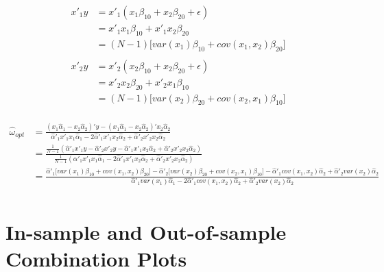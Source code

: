 \documentclass{monashthesis}
\begin{document}
\begin{align*}
    x'_1y &= x'_1(x_1 \beta_{10} + x_2 \beta_{20} + \epsilon) \\
    &= x'_1x_1 \beta_{10} + x'_1x_2 \beta_{20} \\
    &= (N-1) \big[var(x_1)\beta_{10} + cov(x_1,x_2) \beta_{20}\big] \\
\end{align*}
\begin{align*}
    x'_2y &= x'_2(x_2 \beta_{10} + x_2 \beta_{20} + \epsilon) \\
    &= x'_2x_2 \beta_{20} + x'_2x_1 \beta_{10} \\
    &= (N-1) \big[var(x_2)\beta_{20} + cov(x_2,x_1) \beta_{10}\big] \\
\end{align*}

\begin{align*}
    \hat\omega_{opt} &= \frac{(x_1 \hat\alpha_1 - x_2 \hat\alpha_2)' y - (x_1 \hat\alpha_1 - x_2 \hat\alpha_2)' x_2 \hat\alpha_2}{\hat\alpha'_1 x'_1 x_1 \hat\alpha_1 - 2\hat\alpha'_1 x'_1 x_2 \hat\alpha_2 + \hat\alpha'_2 x'_2 x_2 \hat\alpha_2} \\
    &= \frac{\frac{1}{N-1} (\hat\alpha'_1 x'_1y - \hat\alpha'_2 x'_2y - \hat\alpha'_1 x'_1 x_2 \hat\alpha_2 + \hat\alpha'_2 x'_2 x_2 \hat\alpha_2)}{\frac{1}{N-1} (\hat\alpha'_1 x'_1 x_1 \hat\alpha_1 - 2\hat\alpha'_1 x'_1 x_2 \hat\alpha_2 + \hat\alpha'_2 x'_2 x_2 \hat\alpha_2)} \\
    &= \frac{\hat\alpha'_1 \big[var(x_1)\beta_{10} + cov(x_1,x_2) \beta_{20}\big] - \hat\alpha'_2 \big[var(x_2)\beta_{20} + cov(x_2,x_1) \beta_{10}\big] - \hat\alpha'_1 cov(x_1,x_2) \hat\alpha_2 + \hat\alpha'_2 var(x_2) \hat\alpha_2}{\hat\alpha'_1 var(x_1) \hat\alpha_1 - 2\hat\alpha'_1 cov(x_1,x_2) \hat\alpha_2 + \hat\alpha'_2 var(x_2) \hat\alpha_2} \\
\end{align*}

\hypertarget{plot}{%
\section{In-sample and Out-of-sample Combination Plots}\label{plot}}
\end{document}

